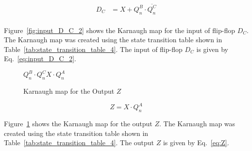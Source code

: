 \begin{equation}
	\begin{split}
		D_C &= X + Q^B_n \cdot \overline{Q^C_n}\\
	\end{split}
	\label{eq:input_D_C_2}
\end{equation}

Figure~\ref{fig:input_D_C_2} shows the Karnaugh map for the input of flip-flop $D_C$. The Karnaugh map was created using the state transition table shown in Table~\ref{tab:state_transition_table_4}. The input of flip-flop $D_C$ is given by Eq.~\ref{eq:input_D_C_2}.

\begin{figure}[ht!]
	\centering
	\begin{Karnaugh}{$Q^B_n \cdot Q^C_n$}{$X \cdot Q^A_n$}
	\end{Karnaugh}
	\caption{Karnaugh map for the Output $Z$}\label{fig:Z}
\end{figure}\FloatBarrier

\begin{equation}
    Z = X \cdot Q^A_n 
    \label{eq:Z}
\end{equation}

Figure~\ref{fig:Z} shows the Karnaugh map for the output $Z$. The Karnaugh map was created using the state transition table shown in Table~\ref{tab:state_transition_table_4}. The output $Z$ is given by Eq.~\ref{eq:Z}.
